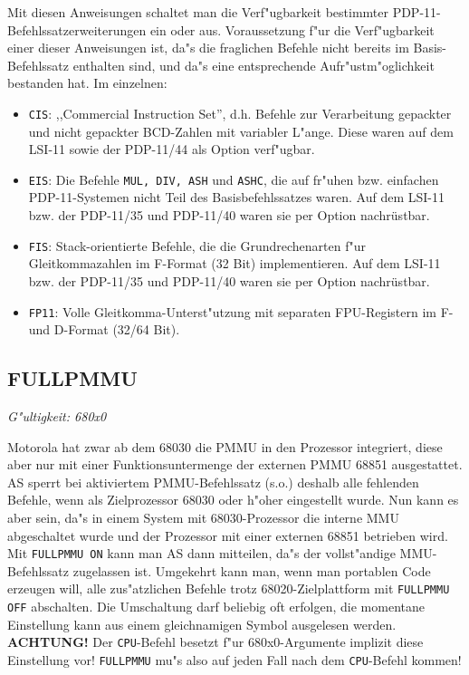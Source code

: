 \documentclass[12pt,a4paper,twoside]{report}
\makeatletter
\newcommand{\bb}[1]{{\bf #1}}
\newcommand{\tty}[1]{{\tt #1}}
\newcommand{\ttindex}[1]{\index{#1@{\tt #1}}}
\makeatother
\begin{document}
Mit diesen Anweisungen schaltet man die Verf"ugbarkeit bestimmter
PDP-11-Befehlssatzerweiterungen ein oder aus.  Voraussetzung f"ur die
Verf"ugbarkeit einer dieser Anweisungen ist, da"s die fraglichen Befehle
nicht bereits im Basis-Befehlssatz enthalten sind, und da"s eine
entsprechende Aufr"ustm"oglichkeit bestanden hat.  Im einzelnen:
\begin{itemize}
\item{{\tt CIS}: ,,Commercial Instruction Set'', d.h. Befehle zur
      Verarbeitung gepackter und nicht gepackter BCD-Zahlen mit
      variabler L"ange.  Diese waren auf dem LSI-11 sowie der
      PDP-11/44 als Option verf"ugbar.}
\item{{\tt EIS}: Die Befehle {\tt MUL, DIV, ASH} und {\tt ASHC},
      die auf fr"uhen bzw. einfachen PDP-11-Systemen nicht Teil
      des Basisbefehlssatzes waren.  Auf dem LSI-11 bzw. der
      PDP-11/35 und PDP-11/40 waren sie per Option nachrüstbar.}
\item{{\tt FIS}: Stack-orientierte Befehle, die die Grundrechenarten
      f"ur Gleitkommazahlen im F-Format (32 Bit) implementieren.
      Auf dem LSI-11 bzw. der PDP-11/35 und PDP-11/40 waren sie
      per Option nachrüstbar.}
\item{{\tt FP11}: Volle Gleitkomma-Unterst"utzung mit separaten
      FPU-Registern im F- und D-Format (32/64 Bit).}
\end{itemize}


\subsection{FULLPMMU}
\ttindex{FULLPMMU}

{\em G"ultigkeit: 680x0}

Motorola hat zwar ab dem 68030 die PMMU in den Prozessor integriert,
diese aber nur mit einer Funktionsuntermenge der externen PMMU 68851
ausgestattet.  AS sperrt bei aktiviertem PMMU-Befehlssatz (s.o.) deshalb
alle fehlenden Befehle, wenn als Zielprozessor 68030 oder h"oher
eingestellt wurde.  Nun kann es aber sein, da"s in einem System mit
68030-Prozessor die interne MMU abgeschaltet wurde und der Prozessor
mit einer externen 68851 betrieben wird.  Mit \tty{FULLPMMU ON} kann man
AS dann mitteilen, da"s der vollst"andige MMU-Befehlssatz zugelassen
ist.  Umgekehrt kann man, wenn man portablen Code erzeugen will, alle
zus"atzlichen Befehle trotz 68020-Zielplattform mit \tty{FULLPMMU OFF}
abschalten.  Die Umschaltung darf beliebig oft erfolgen, die momentane
Einstellung kann aus einem gleichnamigen Symbol ausgelesen werden.
\bb{ACHTUNG!}  Der \tty{CPU}-Befehl besetzt f"ur 680x0-Argumente implizit
diese Einstellung vor!  \tty{FULLPMMU} mu"s also auf jeden Fall nach dem
\tty{CPU}-Befehl kommen!
\end{document}
